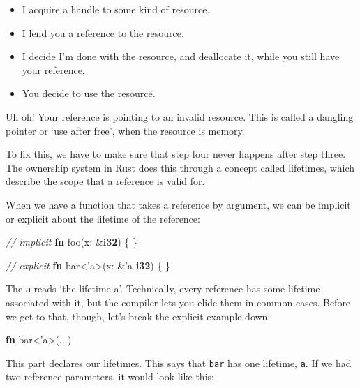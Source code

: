 \documentclass[a4paper,]{book}
\newenvironment{Shaded}{\begin{snugshade}}{\end{snugshade}}
\newcommand{\KeywordTok}[1]{\textcolor[rgb]{0.13,0.29,0.53}{\textbf{{#1}}}}
\newcommand{\CommentTok}[1]{\textcolor[rgb]{0.56,0.35,0.01}{\textit{{#1}}}}
\newcommand{\OtherTok}[1]{\textcolor[rgb]{0.56,0.35,0.01}{{#1}}}
\newcommand{\NormalTok}[1]{{#1}}
\begin{document}
\begin{itemize}
\itemsep1pt\parskip0pt
\item
  I acquire a handle to some kind of resource.
\item
  I lend you a reference to the resource.
\item
  I decide I'm done with the resource, and deallocate it, while you
  still have your reference.
\item
  You decide to use the resource.
\end{itemize}

Uh oh! Your reference is pointing to an invalid resource. This is called
a dangling pointer or `use after free', when the resource is memory.

To fix this, we have to make sure that step four never happens after
step three. The ownership system in Rust does this through a concept
called lifetimes, which describe the scope that a reference is valid
for.

When we have a function that takes a reference by argument, we can be
implicit or explicit about the lifetime of the reference:

\begin{Shaded}
\begin{Highlighting}[]
\CommentTok{// implicit}
\KeywordTok{fn} \NormalTok{foo(x: &}\KeywordTok{i32}\NormalTok{) \{}
\NormalTok{\}}

\CommentTok{// explicit}
\KeywordTok{fn} \NormalTok{bar<}\OtherTok{'a}\NormalTok{>(x: &}\OtherTok{'a} \KeywordTok{i32}\NormalTok{) \{}
\NormalTok{\}}
\end{Highlighting}
\end{Shaded}

The \texttt{\textquotesingle{}a} reads `the lifetime a'. Technically,
every reference has some lifetime associated with it, but the compiler
lets you elide them in common cases. Before we get to that, though,
let's break the explicit example down:

\begin{Shaded}
\begin{Highlighting}[]
\KeywordTok{fn} \NormalTok{bar<}\OtherTok{'a}\NormalTok{>(...)}
\end{Highlighting}
\end{Shaded}

This part declares our lifetimes. This says that \texttt{bar} has one
lifetime, \texttt{\textquotesingle{}a}. If we had two reference
parameters, it would look like this:
\end{document}
